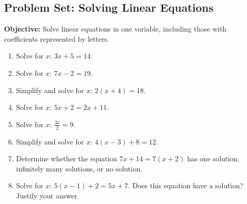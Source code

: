 \documentclass[12pt]{article}
\title{}
\date{}
\begin{document}
\subsection*{Problem Set: Solving Linear Equations}
\onehalfspacing

\begin{tcolorbox}[colframe=black!40, colback=gray!5, 
coltitle=black, colbacktitle=black!20, fonttitle=\bfseries\Large, 
title=Learning Objective, halign title=center, left=5pt, right=5pt, top=5pt, bottom=15pt]
\textbf{Objective:} Solve linear equations in one variable, including those with coefficients represented by letters.
\end{tcolorbox}

\begin{tcolorbox}[colframe=black!60, colback=white, 
coltitle=black, colbacktitle=black!15, fonttitle=\bfseries\Large, 
title=Exercises, halign title=center, left=10pt, right=10pt, top=10pt, bottom=60pt]
\begin{enumerate}[itemsep=3em]
    \item Solve for \(x\): \( 3x + 5 = 14 \).
    \item Solve for \(x\): \( 7x - 2 = 19 \).
    \item Simplify and solve for \(x\): \( 2(x + 4) = 18 \).
    \item Solve for \(x\): \( 5x + 2 = 2x + 11 \).
    \item Solve for \(x\): \( \frac{3x}{2} = 9 \).
    \item Simplify and solve for \(x\): \( 4(x - 3) + 8 = 12 \).
    \item Determine whether the equation \(7x + 14 = 7(x+2)\) has one solution, infinitely many solutions, or no solution.
    \item Solve for \(x\): \(5(x - 1) + 2 = 5x + 7\). Does this equation have a solution? Justify your answer.
\end{enumerate}
\end{tcolorbox}

\vspace{1em}
\end{document}
